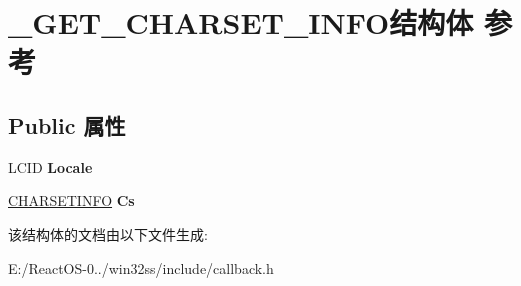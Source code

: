 \hypertarget{struct___g_e_t___c_h_a_r_s_e_t___i_n_f_o}{}\section{\+\_\+\+G\+E\+T\+\_\+\+C\+H\+A\+R\+S\+E\+T\+\_\+\+I\+N\+F\+O结构体 参考}
\label{struct___g_e_t___c_h_a_r_s_e_t___i_n_f_o}
\subsection*{Public 属性}
\begin{DoxyCompactItemize}
\item 
\mbox{\label{struct___g_e_t___c_h_a_r_s_e_t___i_n_f_o_a40780edf8bd73b62ef1fe16e6d98425c}} 
L\+C\+ID {\bfseries Locale}
\item 
\mbox{\label{struct___g_e_t___c_h_a_r_s_e_t___i_n_f_o_ac98d822abf4f164b15a455aaaa1d1ef3}} 
\hyperlink{structtag_c_h_a_r_s_e_t_i_n_f_o}{C\+H\+A\+R\+S\+E\+T\+I\+N\+FO} {\bfseries Cs}
\end{DoxyCompactItemize}


该结构体的文档由以下文件生成\+:\begin{DoxyCompactItemize}
\item 
E\+:/\+React\+O\+S-\/0../win32ss/include/callback.\+h\end{DoxyCompactItemize}
